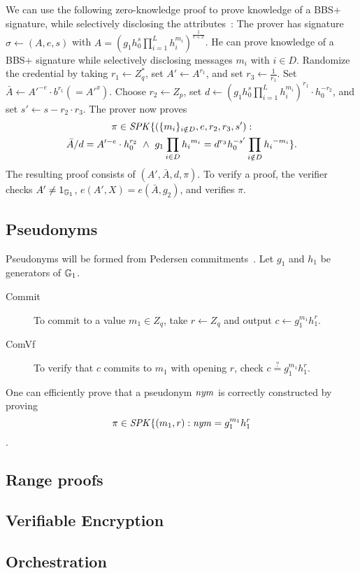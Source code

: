 We can use the following zero-knowledge proof to prove knowledge of a BBS+ signature, while selectively disclosing the attributes~\cite{CDL16eprint}:
The prover has signature $\sigma \gets (A, e, s)$ with $A = (g_1 h_0^s \prod_{i = 1}^{L} h_i^{m_{i}})^{\frac{1}{e+x}}$.
He can prove knowledge of a BBS+ signature while selectively disclosing messages $m_i$ with $i \in D$.
Randomize the credential by taking $r_1 \gets Z_q^*$, set $A' \gets A^{r_1}$, and set $r_3 \gets \frac{1}{r_1}$.
Set $\bar{A} \gets A'^{-e} \cdot b^{r_1} (= A'^{x})$.
Choose $r_2 \gets Z_p$, set $d \gets (g_1 h_0^s \prod_{i = 1}^{L} h_i^{m_{i}})^{r_1} \cdot h_0^{-r_2}$, and set $s' \gets s - r_2 \cdot r_3$.
The prover now proves 
\begin{multline*}
\pi \in \mathit{SPK}\{(\{m_i\}_{i \notin D}, e, r_2, r_3, s') : \\
\bar{A}/d = A'^{-e} \cdot h_0^{r_2} ~\land~ g_1 \prod_{i \in D} {h_{i}}^{m_i}= d^{r_3}h_0^{-s'} \prod_{i \notin D} {h_{i}}^{-m_i}\}.
\end{multline*}
The resulting proof consists of $(A', \bar{A}, d, \pi)$.
To verify a proof, the verifier checks $A' \neq 1_{\mathbb{G}_1}$, $e(A', X) = e(\bar{A}, g_2)$, and verifies $\pi$.

\subsection{Pseudonyms}
Pseudonyms will be formed from Pedersen commitments~\cite{peders91b}.
Let $g_1$ and $h_1$ be generators of $\mathbb{G}_1$.
\begin{description}
\item[Commit] To commit to a value $m_1 \in Z_q$, take $r \gets Z_q$ and output $c \gets g_1^{m_1}h_1^r$.
\item[ComVf] To verify that $c$ commits to $m_1$ with opening $r$, check $c \stackrel{?}{=} g_1^{m_1}h_1^r$.
\end{description}

One can efficiently prove that a pseudonym $\mathit{nym}$ is correctly constructed by proving 
\[ \pi \in \mathit{SPK}\{(m_1, r) : \mathit{nym} = g_1^{m_1} h_1^r \].

\subsection{Range proofs}

\subsection{Verifiable Encryption}

\subsection{Orchestration}
